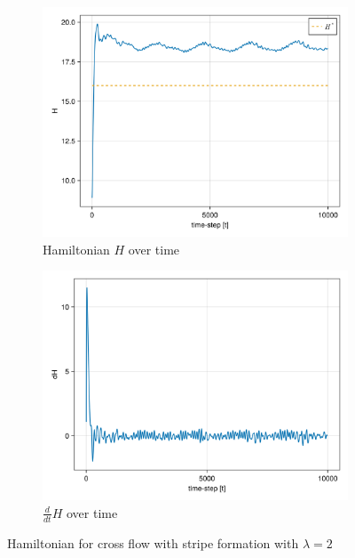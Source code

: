 \begin{itemize}
    \begin{figure}[H]
        \centering
        \begin{subfigure}{.49\textwidth}
            \centering
            \includegraphics[width=\linewidth]{figures/ch5_collective/H_cross2.png}
            \caption{Hamiltonian $H$ over time}
            \label{plot:cross2_h}
        \end{subfigure}
        \begin{subfigure}{.49\textwidth}
            \centering
            \includegraphics[width=\linewidth]{figures/ch5_collective/dH_cross2.png}
            \caption{$\frac{d}{dt}H$ over time}
            \label{plot:cross2_dh}
        \end{subfigure}
        \caption{Hamiltonian for cross flow with stripe formation with $\lambda = 2$}
        \label{plot:cross2_hamiltonian}
    \end{figure}




\end{itemize}
